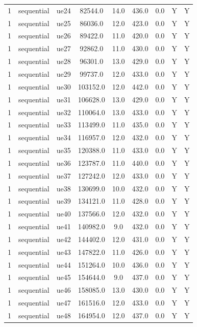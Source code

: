 \begin{table}[ht]
\begin{tabular}{|c|c|c|c|c|c|c|c|c|}
1 & sequential & ue24 & 82544.0 & 14.0 & 436.0 & 0.0 & Y & Y \\
1 & sequential & ue25 & 86036.0 & 12.0 & 423.0 & 0.0 & Y & Y \\
1 & sequential & ue26 & 89422.0 & 11.0 & 420.0 & 0.0 & Y & Y \\
1 & sequential & ue27 & 92862.0 & 11.0 & 430.0 & 0.0 & Y & Y \\
1 & sequential & ue28 & 96301.0 & 13.0 & 429.0 & 0.0 & Y & Y \\
1 & sequential & ue29 & 99737.0 & 12.0 & 433.0 & 0.0 & Y & Y \\
1 & sequential & ue30 & 103152.0 & 12.0 & 442.0 & 0.0 & Y & Y \\
1 & sequential & ue31 & 106628.0 & 13.0 & 429.0 & 0.0 & Y & Y \\
1 & sequential & ue32 & 110064.0 & 13.0 & 433.0 & 0.0 & Y & Y \\
1 & sequential & ue33 & 113499.0 & 11.0 & 435.0 & 0.0 & Y & Y \\
1 & sequential & ue34 & 116957.0 & 12.0 & 432.0 & 0.0 & Y & Y \\
1 & sequential & ue35 & 120388.0 & 11.0 & 433.0 & 0.0 & Y & Y \\
1 & sequential & ue36 & 123787.0 & 11.0 & 440.0 & 0.0 & Y & Y \\
1 & sequential & ue37 & 127242.0 & 12.0 & 433.0 & 0.0 & Y & Y \\
1 & sequential & ue38 & 130699.0 & 10.0 & 432.0 & 0.0 & Y & Y \\
1 & sequential & ue39 & 134121.0 & 11.0 & 428.0 & 0.0 & Y & Y \\
1 & sequential & ue40 & 137566.0 & 12.0 & 432.0 & 0.0 & Y & Y \\
1 & sequential & ue41 & 140982.0 & 9.0 & 432.0 & 0.0 & Y & Y \\
1 & sequential & ue42 & 144402.0 & 12.0 & 431.0 & 0.0 & Y & Y \\
1 & sequential & ue43 & 147822.0 & 11.0 & 426.0 & 0.0 & Y & Y \\
1 & sequential & ue44 & 151264.0 & 10.0 & 436.0 & 0.0 & Y & Y \\
1 & sequential & ue45 & 154644.0 & 9.0 & 437.0 & 0.0 & Y & Y \\
1 & sequential & ue46 & 158085.0 & 13.0 & 430.0 & 0.0 & Y & Y \\
1 & sequential & ue47 & 161516.0 & 12.0 & 433.0 & 0.0 & Y & Y \\
1 & sequential & ue48 & 164954.0 & 12.0 & 437.0 & 0.0 & Y & Y \\

\end{tabular}
\end{table}
